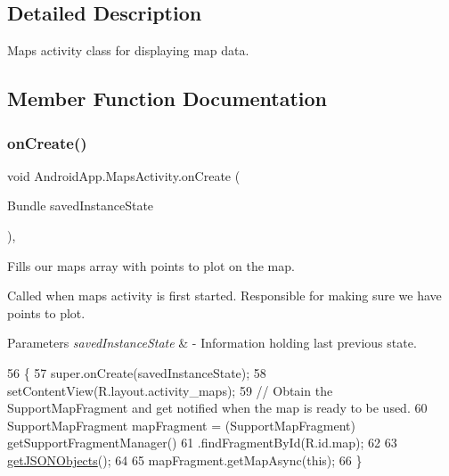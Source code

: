 \subsection{Detailed Description}
Maps activity class for displaying map data. 

\subsection{Member Function Documentation}
\mbox{\label{class_android_app_1_1_maps_activity_a179ec8e25e279c4fa33aa74a90019489}} 
\subsubsection{\texorpdfstring{on\+Create()}{onCreate()}}
{\footnotesize\ttfamily void Android\+App.\+Maps\+Activity.\+on\+Create (\begin{DoxyParamCaption}\item[{Bundle}]{saved\+Instance\+State }\end{DoxyParamCaption})\hspace{0.3cm}{\ttfamily [inline]}, {\ttfamily [protected]}}



Fills our maps array with points to plot on the map. 

Called when maps activity is first started. Responsible for making sure we have points to plot.


\begin{DoxyParams}{Parameters}
{\em saved\+Instance\+State} & -\/ Information holding last previous state. \\
\hline
\end{DoxyParams}

\begin{DoxyCode}
56                                                        \{
57         super.onCreate(savedInstanceState);
58         setContentView(R.layout.activity\_maps);
59         \textcolor{comment}{// Obtain the SupportMapFragment and get notified when the map is ready to be used.}
60         SupportMapFragment mapFragment = (SupportMapFragment) getSupportFragmentManager()
61                 .findFragmentById(R.id.map);
62 
63         \hyperlink{class_android_app_1_1_maps_activity_aaa859d423fe5040453c5af599e220699}{getJSONObjects}();
64 
65         mapFragment.getMapAsync(\textcolor{keyword}{this});
66     \}
\end{DoxyCode}
\mbox{\label{class_android_app_1_1_maps_activity_aaa859d423fe5040453c5af599e220699}} 
